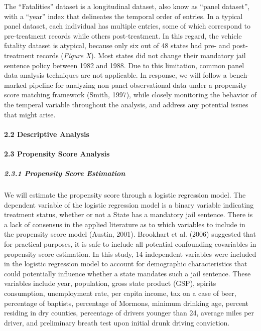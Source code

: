 \documentclass[]{article}
\let\oldparagraph\paragraph
\renewcommand{\paragraph}[1]{\oldparagraph{#1}\mbox{}}
\let\oldsubparagraph\subparagraph
\renewcommand{\subparagraph}[1]{\oldsubparagraph{#1}\mbox{}}
\begin{document}
The ``Fatalities'' dataset is a longitudinal dataset, also know as
``panel dataset'', with a ``year'' index that delineates the temporal
order of entries. In a typical panel dataset, each individual has
multiple entries, some of which correspond to pre-treatment records
while others post-treatment. In this regard, the vehicle fatality
dataset is atypical, because only six out of 48 states had pre- and
post-treatment records (\emph{Figure X}). Most states did not change
their mandatory jail sentence policy between 1982 and 1988. Due to this
limitation, common panel data analysis techniques are not applicable. In
response, we will follow a bench-marked pipeline for analyzing non-panel
observational data under a propensity score matching framework (Smith,
1997), while closely monitoring the behavior of the temperal variable
throughout the analysis, and address any potential issues that might
arise.

\hypertarget{descriptive-analysis}{%
\paragraph{2.2 Descriptive Analysis}\label{descriptive-analysis}}

\hypertarget{propensity-score-analysis}{%
\paragraph{2.3 Propensity Score
Analysis}\label{propensity-score-analysis}}

\hypertarget{propensity-score-estimation}{%
\subparagraph{2.3.1 Propensity Score
Estimation}\label{propensity-score-estimation}}

We will estimate the propensity score through a logistic regression
model. The dependent variable of the logistic regression model is a
binary variable indicating treatment status, whether or not a State has
a mandatory jail sentence. There is a lack of consensus in the applied
literature as to which variables to include in the propensity score
model (Austin, 2001). Brookhart et al. (2006) suggested that for
practical purposes, it is safe to include all potential confounding
covariables in propensity score estimation. In this study, 14
independent variables were included in the logistic regression model to
account for demographic characteristics that could potentially influence
whether a state mandates such a jail sentence. These variables include
year, population, gross state product (GSP), spirits consumption,
unemployment rate, per capita income, tax on a case of beer, percentage
of baptists, percentage of Mormons, minimum drinking age, percent
residing in dry counties, percentage of drivers younger than 24, average
miles per driver, and preliminary breath test upon initial drunk driving
conviction.
\end{document}
